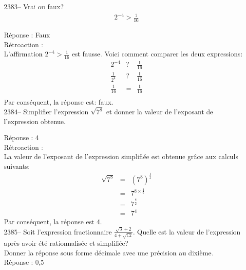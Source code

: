 \documentclass[letterpaper, 12pt]{article}
\begin{document}
2383-- Vrai ou faux?
\begin{eqnarray*}
2^{-4} > \frac{1}{16}
\end{eqnarray*}

R\'eponse : Faux\\

R\'etroaction :\\
L'affirmation $2^{-4} > \frac{1}{16}$ est fausse. Voici comment comparer les deux expressions:
\begin{eqnarray*}
 2^{-4}& ? &\frac{1}{16} \\
 \frac{1}{2^{4}}& ? &\frac{1}{16} \\
 \frac{1}{16}& = &\frac{1}{16} \\
\end{eqnarray*}
Par cons\'equent, la r\'eponse est: faux.\\

2384-- Simplifier l'expression $\sqrt{7^{8}}$ et donner la valeur de l'exposant de l'expression obtenue.

R\'eponse : 4\\

R\'etroaction :\\
La valeur de l'exposant de l'expression simplifi\'ee est obtenue gr\^ace aux calculs suivants:
\begin{eqnarray*}
 \sqrt{7^{8}}&=&(7^{8})^{\frac{1}{2}}\\
&=&7^{8 \times \frac{1}{2}}\\
&=&7^{\frac{8}{2}}\\
&=&7^{4}
\end{eqnarray*}
Par cons\'equent, la r\'eponse est 4.\\

2385--  Soit l'expression fractionnaire $\frac{\sqrt{3}+2}{4+\sqrt{12}}$. Quelle est la valeur de l'expression apr\`es avoir \'et\'e rationnalis\'ee et simplifi\'ee?\\
Donner la r\'eponse sous forme d\'ecimale avec une pr\'ecision au dixi\`eme.\\

R\'eponse : 0,5\\
\end{document}
